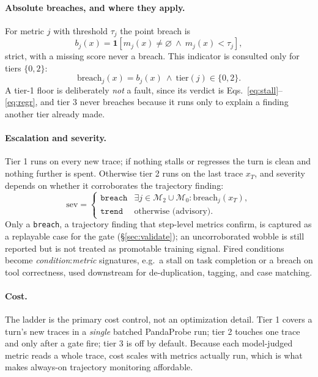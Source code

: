\documentclass[11pt,letterpaper]{article}
\newcommand{\ind}{\mathbf{1}}
\newcommand{\Mset}{\mathcal{M}}
\begin{document}
\paragraph{Absolute breaches, and where they apply.}
For metric $j$ with threshold $\tau_j$ the point breach is
\begin{equation}
  b_j(x)=\ind\!\left[m_j(x)\ne\varnothing\ \wedge\ m_j(x)<\tau_j\right],
  \label{eq:breach}
\end{equation}
strict, with a missing score never a breach. This indicator is consulted only for tiers $\{0,2\}$:
\begin{equation}
  \mathrm{breach}_j(x)=b_j(x)\ \wedge\ \mathrm{tier}(j)\in\{0,2\}.
  \label{eq:absbreach}
\end{equation}
A tier-1 floor is deliberately \emph{not} a fault, since its verdict is
Eqs.~\eqref{eq:stall}--\eqref{eq:regr}, and tier 3 never breaches because it runs only to explain a
finding another tier already made.

\paragraph{Escalation and severity.}
Tier 1 runs on every new trace; if nothing stalls or regresses the turn is clean and nothing further
is spent. Otherwise tier 2 runs on the last trace $x_T$, and severity depends on whether it
corroborates the trajectory finding:
\begin{equation}
\mathrm{sev}=
\begin{cases}
\texttt{breach}&\exists j\in\Mset_2\cup\Mset_0:\mathrm{breach}_j(x_T),\\
\texttt{trend} &\text{otherwise (advisory).}
\end{cases}
\label{eq:sev}
\end{equation}
Only a \texttt{breach}, a trajectory finding that step-level metrics confirm, is captured as a
replayable case for the gate (\S\ref{sec:validate}); an uncorroborated wobble is still reported
but is not treated as promotable training signal. Fired conditions become
\emph{condition}:\emph{metric} signatures, e.g.\ a stall on task completion or a breach on tool
correctness, used downstream for de-duplication, tagging, and case matching.

\paragraph{Cost.}
The ladder is the primary cost control, not an optimization detail. Tier 1 covers a turn's new
traces in a \emph{single} batched PandaProbe run; tier 2 touches one trace and only after a gate
fire; tier 3 is off by default. Because each model-judged metric reads a whole trace, cost scales
with metrics actually run, which is what makes always-on trajectory monitoring affordable.
\end{document}
